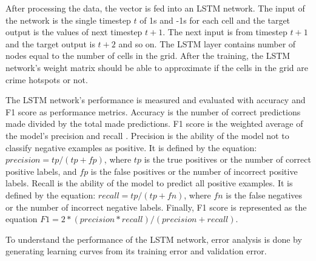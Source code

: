 After processing the data, the vector is fed into an LSTM network. The input of the network is the single timestep $t$ of 1s and -1s for each cell and the target output is the values of next timestep $t+1$. The next input is from timestep $t+1$ and the target output is $t+2$ and so on. The LSTM layer contains number of nodes equal to the number of cells in the grid. After the training, the LSTM network's weight matrix should be able to approximate if the cells in the grid are crime hotspots or not.

The LSTM network's performance is measured and evaluated with accuracy and F1 score as performance metrics. Accuracy is the number of correct predictions made divided by the total made predictions. F1 score is the weighted average of the model's precision and recall \cite{scikit-learn}. Precision is the ability of the model not to classify negative examples as positive. It is defined by the equation: \( precision = tp / (tp + fp) \), where $tp$ is the true positives or the number of correct positive labels, and $fp$ is the false positives or the number of incorrect positive labels. Recall is the ability of the model to predict all positive examples. It is defined by the equation: \( recall = tp / (tp + fn) \), where $fn$ is the false negatives or the number of incorrect negative labels. Finally, F1 score is represented as the equation \(F1 = 2 * (precision * recall) / (precision + recall)\).

To understand the performance of the LSTM network, error analysis is done by generating learning curves from its training error and validation error.